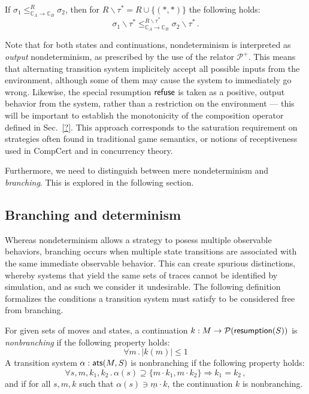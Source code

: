 {\begin{lemma}
If $\sigma_1 \le_{\mathbb{C}_A \rightarrow \mathbb{C}_B}^R \sigma_2$,
then for $R \backslash \tau^* = R \cup \{(\ast, \ast)\}$
the following holds:
\[
  \sigma_1 \backslash \tau^*
  \le_{\mathbb{C}_A \rightarrow \mathbb{C}_B}^{R \backslash \tau^*}
  \sigma_2 \backslash \tau^* \,.
\]
\end{lemma}


Note that for both states and continuations,
nondeterminism is interpreted as \emph{output} nondeterminism,
as prescribed by the use of the relator $\mathcal{P}^+$.
This means that alternating transition system
implicitely accept all possible inputs from the environment,
although some of them may cause the system to immediately go wrong.
Likewise,
the special resumption $ \mathsf{refuse} $
is taken as a positive, output behavior from the system,
rather than a restriction on the environment ---
this will be important to establish the monotonicity
of the composition operator defined in Sec.~\ref{?}.
This approach corresponds to the saturation requirement on strategies
often found in traditional game semantics,
or notions of receptiveness used in CompCert
and in concurrency theory.

Furthermore, we need to distinguish between mere nondeterminism
and \emph{branching}.
This is explored in the following section.

\subsection{Branching and determinism}

Whereas nondeterminism allows a strategy to posess
multiple observable behaviors,
branching occurs when multiple state transitions
are associated with the same immediate observable behavior.
This can create spurious distinctions,
whereby systems that yield the same sets of traces
cannot be identified by simulation,
and as such we consider it undesirable.
The following definition
formalizes the conditions a transition system must satisfy
to be considered free from branching.

\begin{definition}
For given sets of moves and states,
a continuation $k : M \rightarrow \mathcal{P}( \mathsf{resumption} (S))$
is \emph{nonbranching} if the following property holds:
\[ \forall m \,.\, | k(m) | \le 1 \]
A transition system $\alpha :  \mathsf{ats} (M, S)$ is nonbranching
if the following property holds:
\[ \forall s, m, k_1, k_2 \,.\,
     \alpha(s) \supseteq \{ m \cdot k_1, m \cdot k_2 \} \Rightarrow
     k_1 = k_2 \,, \]
and if for all $s, m, k$ such that $\alpha(s) \ni \underline{m} \cdot k$,
the continuation $k$ is nonbranching.
\end{definition}

}
